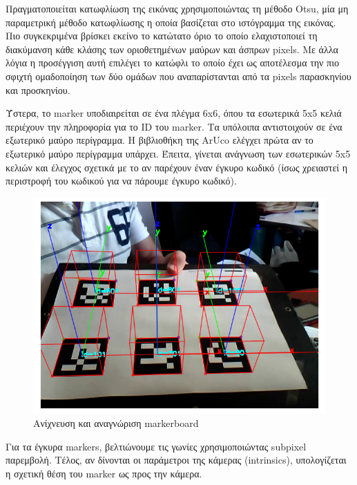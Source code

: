 Πραγματοποιείται κατωφλίωση της εικόνας χρησιμοποιώντας τη μέθοδο Otsu, μία μη παραμετρική μέθοδο κατωφλίωσης η οποία βασίζεται στο ιστόγραμμα της εικόνας. Πιο συγκεκριμένα βρίσκει εκείνο το κατώτατο όριο το οποίο ελαχιστοποιεί τη διακύμανση κάθε κλάσης των οριοθετημένων μαύρων και άσπρων pixels. Με άλλα λόγια η προσέγγιση αυτή επιλέγει το κατώφλι το οποίο έχει ως αποτέλεσμα την πιο σφιχτή ομαδοποίηση των δύο ομάδων που αναπαρίστανται από τα pixels παρασκηνίου και προσκηνίου. 


Ύστερα, το marker υποδιαιρείται σε ένα πλέγμα 6x6, όπου τα εσωτερικά 5x5 κελιά περιέχουν την πληροφορία για το ID του marker. Τα υπόλοιπα αντιστοιχούν σε ένα εξωτερικό μαύρο περίγραμμα. Η βιβλιοθήκη της ArUco ελέγχει πρώτα αν το εξωτερικό μαύρο περίγραμμα υπάρχει. Έπειτα, γίνεται ανάγνωση των εσωτερικών 5x5 κελιών και έλεγχος σχετικά με το αν παρέχουν έναν έγκυρο κωδικό (ίσως χρειαστεί η περιστροφή του κωδικού για να πάρουμε έγκυρο κωδικό). 



\begin{figure}[H]
    \centering
    \includegraphics[scale=0.61, angle=0]{Files/Figures/aruco6.png}
    \caption[Aνίχνευση και αναγνώριση markerboard]{Aνίχνευση και αναγνώριση markerboard}
    \label{fig:aruco6}
\end{figure}





Για τα έγκυρα markers, βελτιώνουμε τις γωνίες χρησιμοποιώντας subpixel παρεμβολή. Τέλος, αν δίνονται οι παράμετροι της κάμερας (intrinsics), υπολογίζεται η σχετική θέση του marker ως προς την κάμερα.





